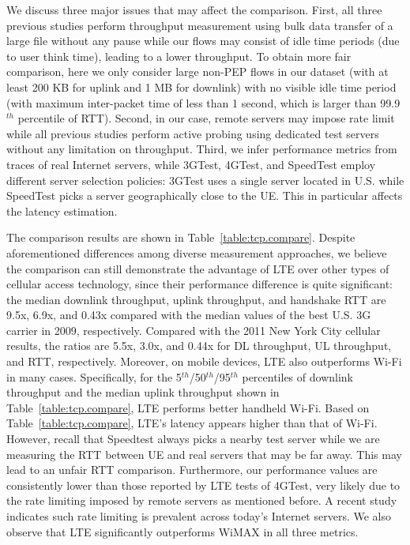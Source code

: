 We discuss three major issues that may affect the comparison. First, all three previous studies perform throughput measurement using bulk data transfer of a large file without any pause while our flows may consist of idle time periods (\eg due to user think time), leading to a lower throughput. To obtain more fair comparison, here we only consider large non-PEP flows in our dataset (with at least 200 KB for uplink and 1 MB for downlink) with no visible idle time period (with maximum inter-packet time of less than 1 second, which is larger than 99.9$^{th}$ percentile of RTT). Second, in our case, remote servers may impose rate limit~\cite{gerber10} while all previous studies perform active probing using dedicated test servers without any limitation on throughput. Third, we infer performance metrics from traces of real Internet servers, while 3GTest, 4GTest, and SpeedTest employ different server selection policies: 3GTest uses a single server located in U.S. while SpeedTest picks a server geographically close to the UE. This in particular affects the latency estimation.

The comparison results are shown in Table~\ref{table:tcp.compare}. Despite aforementioned differences among diverse measurement approaches, we believe the comparison can still demonstrate the advantage of LTE over other types of cellular access technology, since their performance difference is quite significant: the median downlink throughput, uplink throughput, and handshake RTT are 9.5x, 6.9x, and 0.43x compared with the median values of the best U.S. 3G carrier in 2009, respectively. Compared with the 2011 New York City cellular results, the ratios are 5.5x, 3.0x, and 0.44x for DL throughput, UL throughput, and RTT, respectively. Moreover, on mobile devices, LTE also outperforms Wi-Fi in many cases. Specifically, for the 5$^{th}$/50$^{th}$/95$^{th}$ percentiles of downlink throughput and the median uplink throughput shown in Table~\ref{table:tcp.compare}, LTE performs better handheld Wi-Fi. Based on Table~\ref{table:tcp.compare}, LTE's latency appears higher than that of Wi-Fi. However, recall that Speedtest always picks a nearby test server while we are measuring the RTT between UE and real servers that may be far away. This may lead to an unfair RTT comparison. Furthermore, our performance values are consistently lower than those reported by LTE tests of 4GTest, very likely due to the rate limiting imposed by remote servers as mentioned before. A recent study~\cite{gerber10} indicates such rate limiting is prevalent across today's Internet servers. We also observe that LTE significantly outperforms WiMAX in all three metrics.





